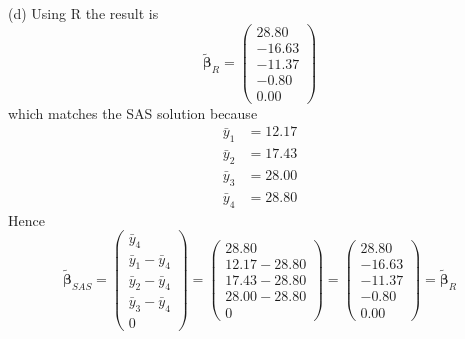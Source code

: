 \bigskip
\noindent
(d) Using R the result is
\[
\bm{\tilde\beta}_R=\left(\begin{array}{r}
28.80\\
-16.63\\
-11.37\\
-0.80\\
0.00
\end{array}\right)
\]
which matches the SAS solution because
\begin{align*}
\bar y_1&=12.17\\
\bar y_2&=17.43\\
\bar y_3&=28.00\\
\bar y_4&=28.80
\end{align*}
Hence
\[
\bm{\tilde\beta}_{SAS}
=\begin{pmatrix}
\bar y_4\\
\bar y_1-\bar y_4\\
\bar y_2-\bar y_4\\
\bar y_3-\bar y_4\\
0
\end{pmatrix}
=\begin{pmatrix}
28.80\\
12.17-28.80\\
17.43-28.80\\
28.00-28.80\\
0
\end{pmatrix}
=
\left(\begin{array}{r}
28.80\\
-16.63\\
-11.37\\
-0.80\\
0.00
\end{array}\right)
=\bm{\tilde\beta}_R
\]

